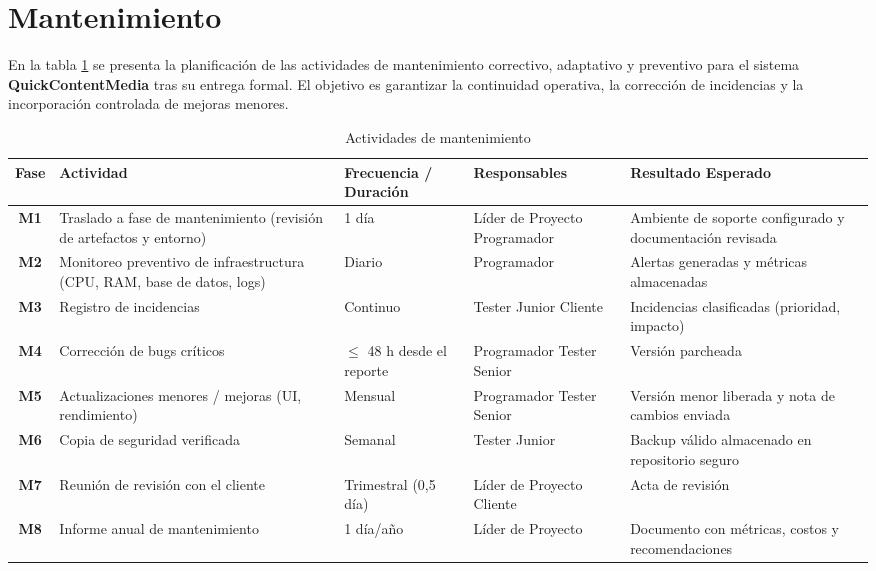 \section{Mantenimiento}
En la tabla \ref{tab:mantenimiento} se presenta la planificación de las
actividades de mantenimiento correctivo, adaptativo y preventivo para
el sistema \textbf{QuickContentMedia} tras su entrega formal.  
El objetivo es garantizar la continuidad operativa, la corrección de
incidencias y la incorporación controlada de mejoras menores.

\vspace{0.5cm}
\small
\begin{table}[H]
\centering
\caption{Actividades de mantenimiento}
\label{tab:mantenimiento}
\begin{tabular}{|c|p{4.2cm}|p{3cm}|p{3cm}|p{4.2cm}|}
\hline
\textbf{Fase} & \textbf{Actividad} & \textbf{Frecuencia / Duración} & \textbf{Responsables} & \textbf{Resultado Esperado} \\ \hline
\textbf{M1} & Traslado a fase de mantenimiento \newline (revisión de artefactos y entorno) & 1 día & Líder de Proyecto \newline Programador & Ambiente de soporte configurado y documentación revisada \\ \hline
\textbf{M2} & Monitoreo preventivo de infraestructura \newline (CPU, RAM, base de datos, logs) & Diario & Programador & Alertas generadas y métricas almacenadas \\ \hline
\textbf{M3} & Registro de incidencias & Continuo & Tester Junior \newline Cliente & Incidencias clasificadas (prioridad, impacto) \\ \hline
\textbf{M4} & Corrección de bugs críticos & $\leq$ 48 h desde el reporte & Programador \newline Tester Senior & Versión parcheada \\ \hline
\textbf{M5} & Actualizaciones menores / mejoras \newline (UI, rendimiento) & Mensual & Programador \newline Tester Senior & Versión menor liberada y nota de cambios enviada \\ \hline
\textbf{M6} & Copia de seguridad verificada & Semanal & Tester Junior & Backup válido almacenado en repositorio seguro \\ \hline
\textbf{M7} & Reunión de revisión con el cliente & Trimestral (0,5 día) & Líder de Proyecto \newline Cliente & Acta de revisión \\ \hline
\textbf{M8} & Informe anual de mantenimiento & 1 día/año & Líder de Proyecto & Documento con métricas, costos y recomendaciones \\ \hline
\end{tabular}
\end{table}
\normalsize

